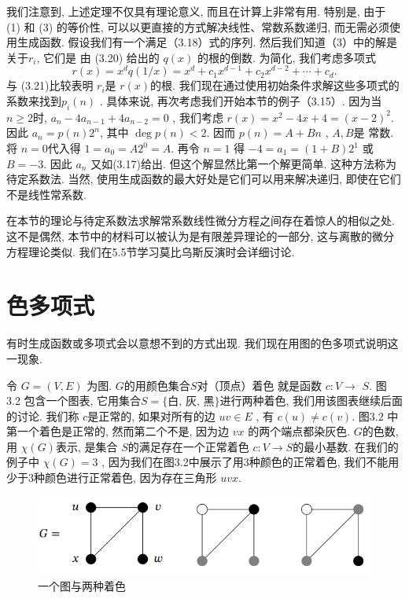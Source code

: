 \documentclass[a4paper,12pt]{ctexbook}
\begin{document}
  我们注意到, 上述定理不仅具有理论意义, 而且在计算上非常有用. 特别是, 由于 (1) 和 (3) 的等价性, 可以以更直接的方式解决线性、常数系数递归, 而无需必须使用生成函数. 假设我们有一个满足（3.18）式的序列. 然后我们知道（3）中的解是关于$r_{i}$, 它们是 由 (3.20) 给出的 $q(x)$ 的根的倒数. 为简化, 我们考虑多项式
$$
r(x)=x^{d} q(1 / x)=x^{d}+c_{1} x^{d-1}+c_{2} x^{d-2}+\cdots+c_{d}.
$$
与 (3.21)比较表明 $r_{i}$是 $r(x)$的根. 我们现在通过使用初始条件求解这些多项式的系数来找到$p_{i}(n)$ .
具体来说, 再次考虑我们开始本节的例子（3.15）. 因为当 $n \geq 2$时,  $a_{n}-4 a_{n-1}+4 a_{n-2}=0$ , 我们考虑 $r(x)=x^{2}-4 x+4=(x-2)^{2}$. 因此 $a_{n}=p(n) 2^{n}$, 其中 $\operatorname{deg} p(n)<2$. 因而 $p(n)=A+B n$ ,  $A, B$是 常数. 将 $n=0$代入得  $1=a_{0}=A 2^{0}=A$. 再令 $n=1$ 得 $-4=a_{1}=(1+B) 2^{1}$ 或 $B=-3$.  因此 $a_{n}$ 又如(3.17)给出. 但这个解显然比第一个解更简单. 这种方法称为待定系数法. 当然, 使用生成函数的最大好处是它们可以用来解决递归, 即使在它们不是线性常系数.

在本节的理论与待定系数法求解常系数线性微分方程之间存在着惊人的相似之处. 这不是偶然, 本节中的材料可以被认为是有限差异理论的一部分, 这与离散的微分方程理论类似. 我们在5.5节学习莫比乌斯反演时会详细讨论.
\section{色多项式}
有时生成函数或多项式会以意想不到的方式出现. 我们现在用图的色多项式说明这一现象.

令 $G=(V, E)$ 为图.  $G$的用颜色集合$S$对（顶点）着色 就是函数 $c: V \rightarrow$ $S$. 图 3.2 包含一个图表, 它用集合$S=\{\text{白, 灰, 黑}\}$进行两种着色, 我们用该图表继续后面的讨论. 我们称 $c$是正常的, 如果对所有的边  $u v \in E$ , 有 $c(u) \neq c(v)$.  图$3.2$ 中第一个着色是正常的, 然而第二个不是, 因为边 $v x$ 的两个端点都染灰色.  $G$的{\kaishu 色数}, 用 $\chi(G)$表示, 是集合 $S$的满足存在一个正常着色  $c: V \rightarrow S$的最小基数. 在我们的例子中 $\chi(G)=3$ , 因为我们在图3.2中展示了用3种颜色的正常着色, 我们不能用少于3种颜色进行正常着色, 因为存在三角形 $u v x$.
\begin{figure}[h]
	\centering
	\includegraphics[width=0.8\linewidth]{./fig3/3-2.png}
	\caption{\label{chapter} 一个图与两种着色}
\end{figure}
\end{document}
